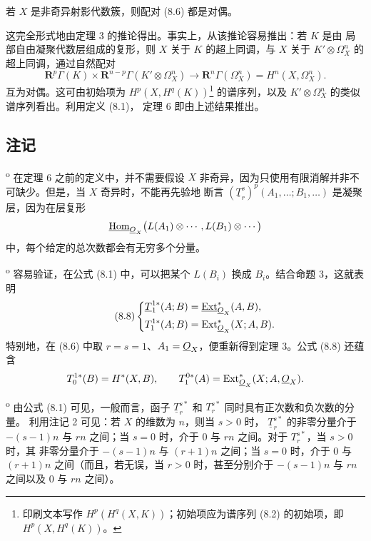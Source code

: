  若 $X$ 是非奇异射影代数簇，则配对 (8.6) 都是对偶。

这完全形式地由定理 3 的推论得出。事实上，从该推论容易推出：若 $K$ 是由
局部自由凝聚代数层组成的复形，则 $X$ 关于 $K$ 的超上同调，与 $X$ 关于
$K'\otimes\Omega_X^{n}$ 的超上同调，通过自然配对
\begin{equation}\tag{8.7}
  \mathbf R^{p}\Gamma(K)
  \times\mathbf R^{n-p}\Gamma(K'\otimes\Omega_X^{n})
  \longrightarrow\mathbf R^{n}\Gamma(\Omega_X^{n})
  =H^{n}(X,\Omega_X^{n}).
\end{equation}
互为对偶。这可由初始项为
$H^{p}(X,H^{q}(K))$\footnote{印刷文本写作
$H^{p}(H^{q}(X,K))$；初始项应为谱序列 (8.2) 的初始项，即
$H^{p}(X,H^{q}(K))$。}
的谱序列，以及 $K'\otimes\Omega_X^{n}$ 的类似谱序列看出。利用定义 (8.1)，
定理 6 即由上述结果推出。

\subsection*{注记}

\textsuperscript{o} 在定理 6 之前的定义中，并不需要假设 $X$
非奇异，因为只使用有限消解并非不可缺少。但是，当 $X$ 奇异时，不能再先验地
断言
$(\underline{T}_{r}^{s})^{p}(A_1,\ldots;B_1,\ldots)$ 是凝聚层，因为在层复形
\[
  \underline{\operatorname{Hom}}_{\underline{O}_X}\bigl(L(A_1)\otimes\cdots,L(B_1)\otimes\cdots\bigr)
\]
中，每个给定的总次数都会有无穷多个分量。

\medskip
{}\textsuperscript{o} 容易验证，在公式 (8.1) 中，可以把某个
$L(B_i)$ 换成 $B_i$。结合命题 3，这就表明
\begin{equation}\tag{8.8}
\left\{
\begin{aligned}
  \underline{T}_{1}^{1*}(A;B)&=\underline{\operatorname{Ext}}_{\underline{O}_X}^{*}(A,B),\\
  T_{1}^{1*}(A;B)&=\operatorname{Ext}_{\underline{O}_X}^{*}(X;A,B).
\end{aligned}
\right.
\end{equation}
特别地，在 (8.6) 中取 $r=s=1$、$A_1=\underline{O}_X$，便重新得到定理 3。公式
(8.8) 还蕴含
\[
  T_{0}^{1*}(B)=H^{*}(X,B),
  \qquad
  T_{1}^{0*}(A)=\operatorname{Ext}_{\underline{O}_X}^{*}(X;A,\underline{O}_X).
\]

\medskip
{}\textsuperscript{o} 由公式 (8.1) 可见，一般而言，函子
$\underline{T}_{r}^{s*}$ 和 $T_{r}^{s*}$ 同时具有正次数和负次数的分量。
利用注记 2 可见：若 $X$ 的维数为 $n$，则当 $s>0$ 时，
$\underline{T}_{r}^{s*}$ 的非零分量介于 $-(s-1)n$ 与 $rn$ 之间；当
$s=0$ 时，介于 $0$ 与 $rn$ 之间。对于 $T_{r}^{s*}$，当 $s>0$ 时，其
非零分量介于 $-(s-1)n$ 与 $(r+1)n$ 之间；当 $s=0$ 时，介于 $0$ 与
$(r+1)n$ 之间（而且，若无误，当 $r>0$ 时，甚至分别介于 $-(s-1)n$
与 $rn$ 之间以及 $0$ 与 $rn$ 之间）。

